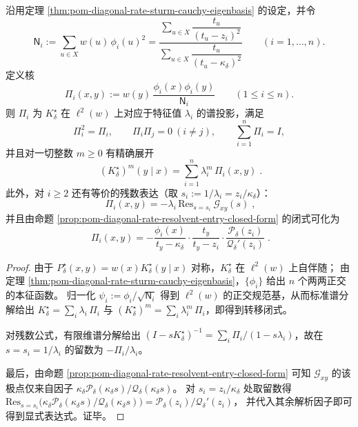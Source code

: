 \begin{theorem}\label{thm:pom-diagonal-rate-spectral-projector-residue-and-transition}
沿用定理 \ref{thm:pom-diagonal-rate-sturm-cauchy-eigenbasis} 的设定，并令
\[
\mathsf N_i:=\sum_{u\in X}w(u)\,\phi_i(u)^2
=\frac{\sum_{u\in X}\dfrac{t_u}{(t_u-z_i)^2}}{\sum_{u\in X}\dfrac{t_u}{(t_u-\kappa_\delta)^2}}
\qquad(i=1,\dots,n).
\]
定义核
\[
\Pi_i(x,y):=w(y)\,\frac{\phi_i(x)\phi_i(y)}{\mathsf N_i}\qquad(1\le i\le n).
\]
则 \(\Pi_i\) 为 \(K^\star_\delta\) 在 \(\ell^2(w)\) 上对应于特征值 \(\lambda_i\) 的谱投影，满足
\[
\Pi_i^2=\Pi_i,\qquad \Pi_i\Pi_j=0\ (i\ne j),\qquad \sum_{i=1}^{n}\Pi_i=I,
\]
并且对一切整数 \(m\ge 0\) 有精确展开
\[
\boxed{\;
(K^\star_\delta)^m(y\mid x)=\sum_{i=1}^{n}\lambda_i^m\,\Pi_i(x,y)\; }.
\]
此外，对 \(i\ge 2\) 还有等价的残数表达（取 \(s_i:=1/\lambda_i=z_i/\kappa_\delta\)）：
\[
\boxed{\;
\Pi_i(x,y)=-\lambda_i\,\mathrm{Res}_{s=s_i}\ \mathcal G_{xy}(s)\; } ,
\]
并且由命题 \ref{prop:pom-diagonal-rate-resolvent-entry-closed-form} 的闭式可化为
\[
\boxed{\;
\Pi_i(x,y)
=-\frac{\phi_i(x)}{t_y-\kappa_\delta}\cdot\frac{t_y}{t_y-z_i}\cdot
\frac{\mathcal P_\delta(z_i)}{\mathcal Q_\delta'(z_i)}\; } .
\]
\end{theorem}
\begin{proof}
由于 \(P^\star_\delta(x,y)=w(x)K^\star_\delta(y\mid x)\) 对称，\(K^\star_\delta\) 在 \(\ell^2(w)\) 上自伴随；
由定理 \ref{thm:pom-diagonal-rate-sturm-cauchy-eigenbasis}，\(\{\phi_i\}\) 给出 \(n\) 个两两正交的本征函数。
归一化 \(\psi_i:=\phi_i/\sqrt{\mathsf N_i}\) 得到 \(\ell^2(w)\) 的正交规范基，从而标准谱分解给出
\(
K^\star_\delta=\sum_i \lambda_i\,\Pi_i
\)
与
\(
(K^\star_\delta)^m=\sum_i \lambda_i^m\,\Pi_i
\)，即得到转移闭式。
\par
对残数公式，有限维谱分解给出
\(
(I-sK^\star_\delta)^{-1}=\sum_i \Pi_i/(1-s\lambda_i)
\)，故在 \(s=s_i=1/\lambda_i\) 的留数为 \(-\Pi_i/\lambda_i\)。
\par
最后，由命题 \ref{prop:pom-diagonal-rate-resolvent-entry-closed-form} 可知 \(\mathcal G_{xy}\) 的该极点仅来自因子
\(
\kappa_\delta\mathcal P_\delta(\kappa_\delta s)/\mathcal Q_\delta(\kappa_\delta s)
\)。
对 \(s_i=z_i/\kappa_\delta\) 处取留数得
\(
\mathrm{Res}_{s=s_i}\bigl(\kappa_\delta\mathcal P_\delta(\kappa_\delta s)/\mathcal Q_\delta(\kappa_\delta s)\bigr)
=\mathcal P_\delta(z_i)/\mathcal Q_\delta'(z_i)
\)，
并代入其余解析因子即可得到显式表达式。证毕。
\end{proof}

